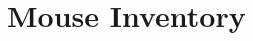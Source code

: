 \documentclass[11pt, english, twoside, a4paper]{book}
\begin{document}
 
  
\frontmatter 
	 
	 
	 
	\tableofcontents 
  
\mainmatter %
\chapter{Mouse Inventory} 
\end{document}
